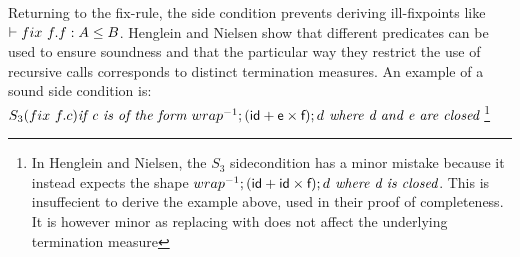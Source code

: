 \documentclass[a4paper,UKenglish,cleveref, autoref, thm-restate]{lipics-v2021}
\begin{document}
Returning to the fix-rule, the side condition prevents deriving ill-fixpoints like $\contains{}{\fix ~ f.f}{A}{B}$. Henglein and Nielsen show that different predicates can be used to ensure soundness and that the particular way they restrict the use of recursive calls corresponds to distinct termination measures. An example of a sound side condition is:\\
$S_3(\fix ~f.c) \textit{if c is of the form } \dslcominv{wrap};(\dslcom{id}+\dslcom{e} \times \dslcom{f});d \textit{ where d and e are closed}$ \footnote{In Henglein and Nielsen, the $S_3$ sidecondition has a minor mistake because it instead expects the shape $\dslcominv{wrap};(\dslcom{id}+\dslcom{id} \times \dslcom{f});d \textit{ where d is closed}$. This is insuffecient to derive the example above, used in their proof of completeness. It is however minor as replacing  with  does not affect the underlying termination measure}
\end{document}

